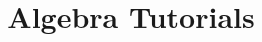 \documentclass[a4paper, answers]{exam}
\title{Algebra Tutorials}
\author{}
\begin{document}
    \maketitle
    \begin{questions}
%       
        
    \end{questions}
\end{document}
